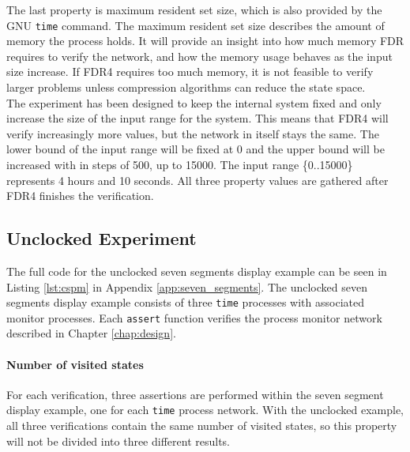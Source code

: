 The last property is maximum resident set size, which is also provided by the GNU \texttt{time} command. The maximum resident set size describes the amount of memory the process holds. It will provide an insight into how much memory FDR requires to verify the network, and how the memory usage behaves as the input size increase. If FDR4 requires too much memory, it is not feasible to verify larger problems unless compression algorithms can reduce the state space. \\

The experiment has been designed to keep the internal system fixed and only increase the size of the input range for the system. This means that FDR4 will verify increasingly more values, but the network in itself stays the same.
The lower bound of the input range will be fixed at 0 and the upper bound will be increased with in steps of 500, up to 15000. The input range \{0..15000\} represents 4 hours and 10 seconds. All three property values are gathered after FDR4 finishes the verification.
\subsection{Unclocked Experiment}
The full code for the unclocked seven segments display example can be seen in Listing \ref{lst:cspm} in Appendix \ref{app:seven_segments}.
The unclocked seven segments display example consists of three \texttt{time} processes with associated monitor processes. Each \texttt{assert} function verifies the process monitor network described in Chapter \ref{chap:design}.
\paragraph{Number of visited states}
For each verification, three assertions are performed within the seven segment display example, one for each \texttt{time} process network. With the unclocked example, all three verifications contain the same number of visited states, so this property will not be divided into three different results.\\

